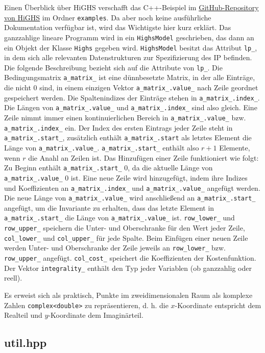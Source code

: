 \documentclass[a4paper, 10pt, ngerman]{article}
\begin{document}
Einen Überblick über HiGHS verschafft das C++-Beispiel im \href{https://github.com/ERGO-Code/HiGHS}{GitHub-Repository von HiGHS} im Ordner \verb|examples|. Da aber noch keine ausführliche Dokumentation verfügbar ist, wird das Wichtigste hier kurz erklärt. Das ganzzahlige lineare Programm wird in ein \verb|HighsModel| geschrieben, das dann an ein Objekt der Klasse \verb|Highs| gegeben wird. \verb|HighsModel| besitzt das Attribut \verb|lp_|, in dem sich alle relevanten Datenstrukturen zur Spezifizierung des IP befinden. Die folgende Beschreibung bezieht sich auf die Attribute von \verb|lp_|. Die Bedingungsmatrix \verb|a_matrix_| ist eine dünnbesetzte Matrix, in der alle Einträge, die nicht 0 sind, in einem einzigen Vektor \verb|a_matrix_.value_| nach Zeile geordnet gespeichert werden. Die Spaltenindizes der Einträge stehen in \verb|a_matrix_.index_|. Die Längen von \verb|a_matrix_.value_| und \verb|a_matrix_.index_| sind also gleich. Eine Zeile nimmt immer einen kontinuierlichen Bereich in \verb|a_matrix_.value_| bzw. \verb|a_matrix_.index_| ein. Der Index des ersten Eintrags jeder Zeile steht in \verb|a_matrix_.start_|, zusätzlich enthält \verb|a_matrix_.start| als letztes Element die Länge von \verb|a_matrix_.value_|. \verb|a_matrix_.start_| enthält also $r + 1$ Elemente, wenn $r$ die Anahl an Zeilen ist. Das Hinzufügen einer Zeile funktioniert wie folgt: Zu Beginn enthält \verb|a_matrix_.start_| 0, da die aktuelle Länge von \verb|a_matrix_.value_| 0 ist. Eine neue Zeile wird hinzugefügt, indem ihre Indizes und Koeffizienten an \verb|a_matrix_.index_| und \verb|a_matrix_.value_| angefügt werden. Die neue Länge von \verb|a_matrix_.value_| wird anschließend an \verb|a_matrix_.start_| angefügt, um die Invariante zu erhalten, dass das letzte Element in \verb|a_matrix_.start_| die Länge von \verb|a_matrix_.value_| ist. \verb|row_lower_| und \verb|row_upper_| speichern die Unter- und Oberschranke für den Wert jeder Zeile, \verb|col_lower_| und \verb|col_upper_| für jede Spalte. Beim Einfügen einer neuen Zeile werden Unter- und Oberschranke der Zeile jeweils an \verb|row_lower_| bzw. \verb|row_upper_| angefügt. \verb|col_cost_| speichert die Koeffizienten der Kostenfunktion. Der Vektor \verb|integrality_| enthält den Typ jeder Variablen (ob ganzzahlig oder reell).

Es erweist sich als praktisch, Punkte im zweidimensionalen Raum als komplexe Zahlen \verb|complex<double>| zu repräsentieren, d. h. die $x$-Koordinate entspricht dem Realteil und $y$-Koordinate dem Imaginärteil. 

\subsection{util.hpp}
\end{document}
